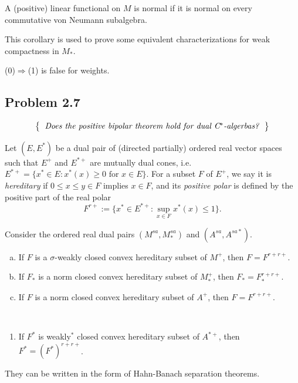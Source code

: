 \documentclass{../../../../small}
\begin{document}
\begin{corollary*}
A (positive) linear functional on $M$ is normal if it is normal on every commutative von Neumann subalgebra.
\end{corollary*}

\begin{remark*}
This corollary is used to prove some equivalent characterizations for weak compactness in $M_*$.
\end{remark*}

\begin{remark*}
(0)$\Rightarrow$(1) is false for weights.
\end{remark*}


\subsection{Problem 2.7}
\smallskip
\[\left\{\begin{tabular}{c}
\textit{Does the positive bipolar theorem hold for dual C$^*$-algerbas?}
\end{tabular}\right\}\]

\begin{definition*}
Let $(E,E^*)$ be a dual pair of (directed partially) ordered real vector spaces such that $E^+$ and $E^{*+}$ are mutually dual cones, i.e.~$E^{*+}=\{x^*\in E:x^*(x)\ge0\text{ for }x\in E\}$.
For a subset $F$ of $E^+$, we say it is \emph{hereditary} if $0\le x\le y\in F$ implies $x\in F$, and its \emph{positive polar} is defined by the positive part of the real polar
\[F^{r+}:=\{x^*\in E^{*+}:\sup_{x\in F}x^*(x)\le1\}.\]
\end{definition*}

\begin{theorem*}[Haagerup 1975]
Consider the ordered real dual pairs $(M^{sa},M_*^{sa})$ and $(A^{sa},A^{sa*})$.
\begin{enumerate}[(a)]
\item If $F$ is a $\sigma$-weakly closed convex hereditary subset of $M^+$, then $F=F^{r+r+}$.
\item If $F_*$ is a norm closed convex hereditary subset of $M_*^+$, then $F_*=F_*^{r+r+}$.
\item If $F$ is a norm closed convex hereditary subset of $A^+$, then $F=F^{r+r+}$.
\end{enumerate}
\end{theorem*}
\begin{theorem*}[C.~2025]\,
\begin{enumerate}
\item[(d)] If $F^*$ is weakly$^*$ closed convex hereditary subset of $A^{*+}$, then $F^*=(F^*)^{r+r+}$.
\end{enumerate}
\end{theorem*}
\begin{remark*}
They can be written in the form of Hahn-Banach separation theorems.
\end{remark*}
\end{document}

